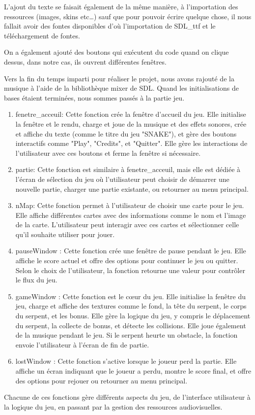\documentclass{article}
\begin{document}
L’ajout du texte se faisait également de la même manière, à l’importation des ressources (images, skins etc…) sauf que pour pouvoir écrire quelque chose, il nous fallait avoir des fontes disponibles d'où l'importation de SDL\_ttf et le téléchargement de fontes.

On a également ajouté des boutons qui exécutent du code quand on clique dessus, dans notre cas, ils ouvrent différentes fenêtres.

Vers la fin du temps imparti pour réaliser le projet, nous avons rajouté de la musique à l’aide de la bibliothèque mixer de SDL.
Quand les initialisations de bases étaient terminées, nous sommes passés à la partie jeu.
\begin{enumerate}
    \item fenetre\_acceuil:
        Cette fonction crée la fenêtre d'accueil du jeu. Elle initialise la fenêtre et le rendu, charge et joue de la musique et des effets sonores, crée et affiche du texte (comme le titre du jeu "SNAKE"), et gère des boutons interactifs comme "Play", "Credits", et "Quitter". Elle gère les interactions de l'utilisateur avec ces boutons et ferme la fenêtre si nécessaire.
    \item partie:
        Cette fonction est similaire à fenetre\_acceuil, mais elle est dédiée à l'écran de sélection du jeu où l'utilisateur peut choisir de démarrer une nouvelle partie, charger une partie existante, ou retourner au menu principal.
    \item nMap:
        Cette fonction permet à l'utilisateur de choisir une carte pour le jeu. Elle affiche différentes cartes avec des informations comme le nom et l'image de la carte. L'utilisateur peut interagir avec ces cartes et sélectionner celle qu'il souhaite utiliser pour jouer.
    \item pauseWindow :
        Cette fonction crée une fenêtre de pause pendant le jeu. Elle affiche le score actuel et offre des options pour continuer le jeu ou quitter. Selon le choix de l'utilisateur, la fonction retourne une valeur pour contrôler le flux du jeu.
    \item gameWindow :
        Cette fonction est le cœur du jeu. Elle initialise la fenêtre du jeu, charge et affiche des textures comme le fond, la tête du serpent, le corps du serpent, et les bonus. Elle gère la logique du jeu, y compris le déplacement du serpent, la collecte de bonus, et détecte les collisions. Elle joue également de la musique pendant le jeu. Si le serpent heurte un obstacle, la fonction envoie l'utilisateur à l'écran de fin de partie.
    \item lostWindow : 
        Cette fonction s'active lorsque le joueur perd la partie. Elle affiche un écran indiquant que le joueur a perdu, montre le score final, et offre des options pour rejouer ou retourner au menu principal.
    
\end{enumerate}
Chacune de ces fonctions gère différents aspects du jeu, de l'interface utilisateur à la logique du jeu, en passant par la gestion des ressources audiovisuelles.
\end{document}
